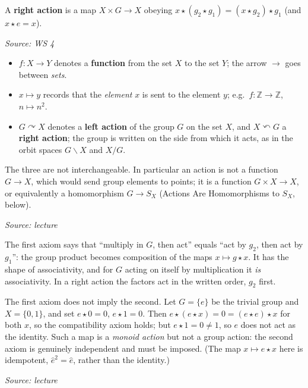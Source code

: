 \documentclass[11pt]{report}
\newcommand{\srcline}[1]{\par\hfill{\footnotesize\textit{Source: #1}}}
\begin{document}
\begin{defbox}\label{def:right-action}
A \textbf{right action} is a map $X \times G \to X$ obeying $x \star (g_2 \star g_1) = (x \star g_2) \star g_1$ (and $x \star e = x$).
\srcline{WS 4}
\end{defbox}

\begin{defbox}\label{def:arrow-notation}
\begin{itemize}[nosep]
    \item $f: X \to Y$ denotes a \textbf{function} from the set $X$ to the set $Y$; the arrow $\to$ goes between \emph{sets}.
    \item $x \mapsto y$ records that the \emph{element} $x$ is sent to the element $y$; e.g.\ $f: \mathbb{Z} \to \mathbb{Z}$, $n \mapsto n^2$.
    \item $G \curvearrowright X$ denotes a \textbf{left action} of the group $G$ on the set $X$, and $X \curvearrowleft G$ a \textbf{right action}; the group is written on the side from which it acts, as in the orbit spaces $G \backslash X$ and $X/G$.
\end{itemize}
The three are not interchangeable. In particular an action is not a function $G \to X$, which would send group elements to points; it is a function $G \times X \to X$, or equivalently a homomorphism $G \to S_X$ (Actions Are Homomorphisms to $S_X$, below).
\srcline{lecture}
\end{defbox}


\begin{rembox}\label{rem:reading-axiom}
The first axiom says that ``multiply in $G$, then act'' equals ``act by $g_2$, then act by $g_1$'': the group product becomes composition of the maps $x \mapsto g \star x$. It has the shape of associativity, and for $G$ acting on itself by multiplication it \emph{is} associativity. In a right action the factors act in the written order, $g_2$ first.
\end{rembox}

\begin{exbox}[{Why $e \star x = x$ Must Be an Axiom}]\label{ex:why-e-x-x-must-axiom}
The first axiom does not imply the second. Let $G = \{e\}$ be the trivial group and $X = \{0, 1\}$, and set $e \star 0 = 0$, $e \star 1 = 0$. Then $e \star (e \star x) = 0 = (e \star e) \star x$ for both $x$, so the compatibility axiom holds; but $e \star 1 = 0 \neq 1$, so $e$ does not act as the identity. Such a map is a \emph{monoid action} but not a group action: the second axiom is genuinely independent and must be imposed. (The map $x \mapsto e \star x$ here is idempotent, $\hat e^2 = \hat e$, rather than the identity.)
\srcline{lecture}
\end{exbox}
\end{document}
